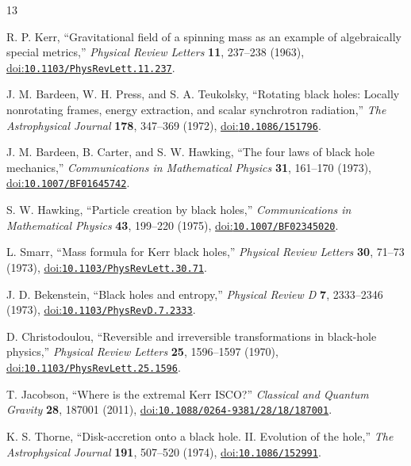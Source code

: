 \documentclass[12pt]{article}
\begin{document}
\begin{thebibliography}{13}
\small
{}
\raggedright
{}

R. P. Kerr,
``Gravitational field of a spinning mass as an example of algebraically special metrics,''
\emph{Physical Review Letters} \textbf{11}, 237--238 (1963),
\href{https://doi.org/10.1103/PhysRevLett.11.237}{doi:\nolinkurl{10.1103/PhysRevLett.11.237}}.

J. M. Bardeen, W. H. Press, and S. A. Teukolsky,
``Rotating black holes: Locally nonrotating frames, energy extraction, and scalar synchrotron radiation,''
\emph{The Astrophysical Journal} \textbf{178}, 347--369 (1972),
\href{https://doi.org/10.1086/151796}{doi:\nolinkurl{10.1086/151796}}.

J. M. Bardeen, B. Carter, and S. W. Hawking,
``The four laws of black hole mechanics,''
\emph{Communications in Mathematical Physics} \textbf{31}, 161--170 (1973),
\href{https://doi.org/10.1007/BF01645742}{doi:\nolinkurl{10.1007/BF01645742}}.

S. W. Hawking,
``Particle creation by black holes,''
\emph{Communications in Mathematical Physics} \textbf{43}, 199--220 (1975),
\href{https://doi.org/10.1007/BF02345020}{doi:\nolinkurl{10.1007/BF02345020}}.

L. Smarr,
``Mass formula for Kerr black holes,''
\emph{Physical Review Letters} \textbf{30}, 71--73 (1973),
\href{https://doi.org/10.1103/PhysRevLett.30.71}{doi:\nolinkurl{10.1103/PhysRevLett.30.71}}.

J. D. Bekenstein,
``Black holes and entropy,''
\emph{Physical Review D} \textbf{7}, 2333--2346 (1973),
\href{https://doi.org/10.1103/PhysRevD.7.2333}{doi:\nolinkurl{10.1103/PhysRevD.7.2333}}.

D. Christodoulou,
``Reversible and irreversible transformations in black-hole physics,''
\emph{Physical Review Letters} \textbf{25}, 1596--1597 (1970),
\href{https://doi.org/10.1103/PhysRevLett.25.1596}{doi:\nolinkurl{10.1103/PhysRevLett.25.1596}}.

T. Jacobson,
``Where is the extremal Kerr ISCO?''
\emph{Classical and Quantum Gravity} \textbf{28}, 187001 (2011),
\href{https://doi.org/10.1088/0264-9381/28/18/187001}{doi:\nolinkurl{10.1088/0264-9381/28/18/187001}}.

K. S. Thorne,
``Disk-accretion onto a black hole. II. Evolution of the hole,''
\emph{The Astrophysical Journal} \textbf{191}, 507--520 (1974),
\href{https://doi.org/10.1086/152991}{doi:\nolinkurl{10.1086/152991}}.


\end{thebibliography}
\end{document}
